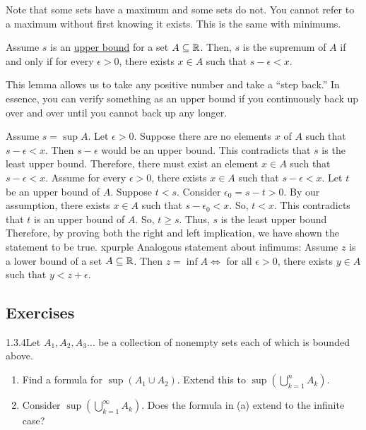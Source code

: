 Note that some sets have a maximum and some sets do not. You cannot refer to a maximum without first knowing it exists. This is the same with minimums.

\begin{lemma}
    Assume \(s\) is an \hyperref[def:1.3.1]{upper bound} for a set \(A \subseteq \mathbb{R}\). Then, \(s\) is the supremum of \(A\) if and only if for every \(\epsilon > 0\), there exists \(x\in A\) such that \(s - \epsilon < x\).
\end{lemma}

This lemma allows us to take any positive number and take a ``step back.'' In essence, you can verify something as an upper bound if you continuously back up over and over until you cannot back up any longer.

\iffpfbase%
{
    Assume \(s = \sup A\). Let \(\epsilon > 0\). Suppose there are no elements \(x\) of \(A\) such that \(s - \epsilon < x\). Then \(s - \epsilon\) would be an upper bound. This contradicts that \(s\) is the least upper bound. Therefore, there must exist an element \(x \in A\) such that \(s - \epsilon < x\).
}{
    Assume for every \(\epsilon > 0\), there exists \(x \in A\) such that \(s - \epsilon < x\). Let \(t\) be an upper bound of \(A\). Suppose \(t < s\). Consider \(\epsilon_0 = s - t > 0\). By our assumption, there exists \(x \in A\) such that \(s - \epsilon_0 < x\). So, \(t < x\). This contradicts that \(t\) is an upper bound of \(A\). So, \(t \geq s\). Thus, \(s\) is the least upper bound
}{
    Therefore, by proving both the right and left implication, we have shown the statement to be true.
}{xpurple}
Analogous statement about infimums: Assume \(z\) is a lower bound of a set \(A \subseteq \mathbb{R}\). Then \(z = \inf A \iff \) for all \( \epsilon >0\), there exists \(y \in A\) such that \(y < z + \epsilon\).

\renewcommand{\theenumi}{\alph{enumi}}
\renewcommand{\labelenumi}{(\theenumi)}
\subsection{Exercises}

\begin{exercise}
    {1.3.4}Let \(A_1,A_2,A_3\dots\) be a collection of nonempty sets each of which is bounded above.
    \begin{enumerate}
        \item Find a formula for \(\sup(A_1 \cup A_2)\). Extend this to \(\sup (\bigcup^n_{k=1}A_k)\).
        \item Consider \(\sup(\bigcup^\infty_{k=1} A_k)\). Does the formula in (a) extend to the infinite case?
    \end{enumerate}
\end{exercise}

